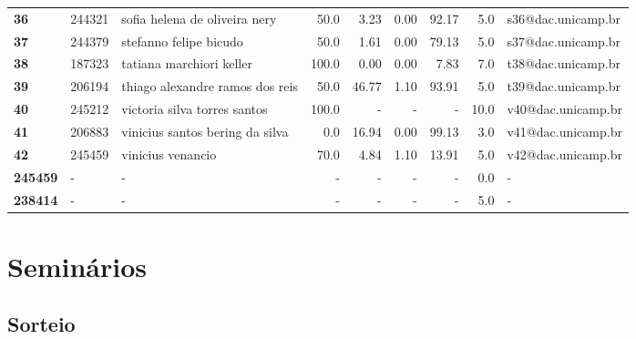 \documentclass[11pt]{article}
\begin{document}
\begin{center}
\begin{landscape}
\begin{longtable}{lllrrrrrl}
\textbf{36    } &  244321 &         sofia helena de oliveira nery &                  50.0 &        3.23 &        0.00 &       92.17 &                      5.0 &  s36@dac.unicamp.br \\
\textbf{37    } &  244379 &                stefanno felipe bicudo &                  50.0 &        1.61 &        0.00 &       79.13 &                      5.0 &  s37@dac.unicamp.br \\
\textbf{38    } &  187323 &              tatiana marchiori keller &                 100.0 &        0.00 &        0.00 &        7.83 &                      7.0 &  t38@dac.unicamp.br \\
\textbf{39    } &  206194 &       thiago alexandre ramos dos reis &                  50.0 &       46.77 &        1.10 &       93.91 &                      5.0 &  t39@dac.unicamp.br \\
\textbf{40    } &  245212 &          victoria silva torres santos &                 100.0 &           - &           - &           - &                     10.0 &  v40@dac.unicamp.br \\
\textbf{41    } &  206883 &       vinicius santos bering da silva &                   0.0 &       16.94 &        0.00 &       99.13 &                      3.0 &  v41@dac.unicamp.br \\
\textbf{42    } &  245459 &                     vinicius venancio &                  70.0 &        4.84 &        1.10 &       13.91 &                      5.0 &  v42@dac.unicamp.br \\
\textbf{245459} &       - &                                     - &                     - &           - &           - &           - &                      0.0 &                   - \\
\textbf{238414} &       - &                                     - &                     - &           - &           - &           - &                      5.0 &                   - \\
\end{longtable}
\end{landscape}\end{center}


\section{Seminários}
\label{sec:org6876697}
\subsection{Sorteio}
\label{sec:orgbd629ac}
\end{document}
